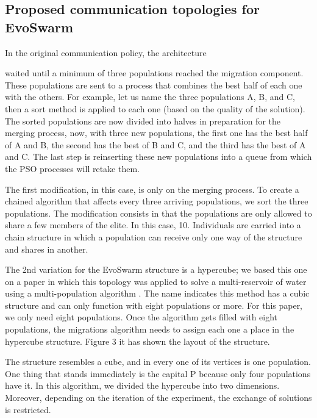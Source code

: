 \documentclass[runningheads]{llncs}
\begin{document}
\subsection{Proposed communication topologies for EvoSwarm}

In the original communication policy, the architecture %

waited until a minimum of
three populations reached the migration component. %
These populations are sent to
a process that combines the best half of each one with the others. For example,
let us name the three populations A, B, and C, then a sort method is applied to
each one (based on the quality of the solution). The sorted populations are now
divided into halves in preparation for the merging process, now, with three new
populations, the first one has the best half of A and B, the second has the best
of B and C, and the third has the best of A and C. The last step is reinserting
these new populations into a queue from which the PSO processes will retake
them.

The first modification, in this case, is only on the merging process. To create
a chained algorithm that affects every three arriving populations, we sort the
three populations. The modification consists in that the populations are only
allowed to share a few members of the elite. In this case, 10. Individuals are
carried into a chain structure in which a population can receive only one way of
the structure and shares in another.

The 2nd variation for the EvoSwarm structure is a hypercube; we based this one
on a paper in which this topology was applied to solve a multi-reservoir of
water using a multi-population algorithm \cite{b20}. The name indicates this
method has a cubic structure and can only function with eight populations or
more. For this paper, we only need eight populations. Once the algorithm gets
filled with eight populations, the migrations algorithm needs to assign each one
a place in the hypercube structure. Figure 3 it has shown the layout of the
structure.

The structure resembles a cube, and in every one of its vertices is one
population. One thing that stands immediately is the capital P because only four
populations have it. In this algorithm, we divided the hypercube into two
dimensions. Moreover, depending on the iteration of the experiment, the exchange
of solutions is restricted.
\end{document}
